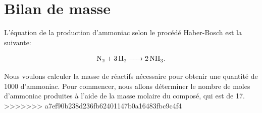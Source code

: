 %
%
%
%


\section{Bilan de masse}

L'équation de la production d'ammoniac selon le procédé Haber-Bosch est la suivante: 

\[
  \ce {N2 + 3H2 -> 2NH3}
  \text.
\]

Nous voulons calculer la masse de réactifs nécessaire pour obtenir une quantité de \unit{1000}{\tonne}  d'ammoniac. Pour commencer, nous allons déterminer le nombre de moles d'ammoniac produites à l'aide de la masse molaire du composé, qui est de \unit{17}{\gram\per\mole}.
>>>>>>> a7ef90b238d236fb62401147b0a16483fbc9c4f4

